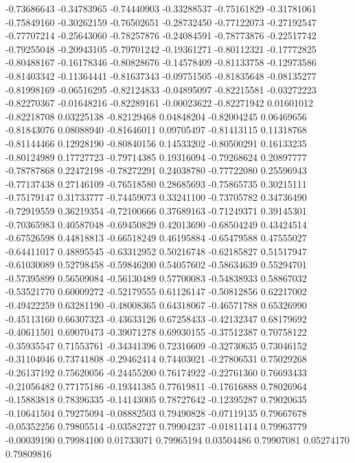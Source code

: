-0.73686643  -0.34783965 
-0.74440903  -0.33288537 
-0.75161829  -0.31781061 
-0.75849160  -0.30262159 
-0.76502651  -0.28732450 
-0.77122073  -0.27192547 
-0.77707214  -0.25643060 
-0.78257876  -0.24084591 
-0.78773876  -0.22517742 
-0.79255048  -0.20943105 
-0.79701242  -0.19361271 
-0.80112321  -0.17772825 
-0.80488167  -0.16178346 
-0.80828676  -0.14578409 
-0.81133758  -0.12973586 
-0.81403342  -0.11364441 
-0.81637343  -0.09751505 
-0.81835648  -0.08135277 
-0.81998169  -0.06516295 
-0.82124833  -0.04895097 
-0.82215581  -0.03272223 
-0.82270367  -0.01648216 
-0.82289161  -0.00023622 
-0.82271942  0.01601012  
-0.82218708  0.03225138  
-0.82129468  0.04848204  
-0.82004245  0.06469656  
-0.81843076  0.08088940  
-0.81646011  0.09705497  
-0.81413115  0.11318768  
-0.81144466  0.12928190  
-0.80840156  0.14533202  
-0.80500291  0.16133235  
-0.80124989  0.17727723  
-0.79714385  0.19316094  
-0.79268624  0.20897777  
-0.78787868  0.22472198  
-0.78272291  0.24038780  
-0.77722080  0.25596943  
-0.77137438  0.27146109  
-0.76518580  0.28685693  
-0.75865735  0.30215111  
-0.75179147  0.31733777  
-0.74459073  0.33241100  
-0.73705782  0.34736490  
-0.72919559  0.36219354  
-0.72100666  0.37689163  
-0.71249371  0.39145301  
-0.70365983  0.40587048  
-0.69450829  0.42013690  
-0.68504249  0.43424514  
-0.67526598  0.44818813  
-0.66518249  0.46195884  
-0.65479588  0.47555027  
-0.64411017  0.48895545  
-0.63312952  0.50216748  
-0.62185827  0.51517947  
-0.61030089  0.52798458  
-0.59846200  0.54057602  
-0.58634639  0.55294701  
-0.57395899  0.56509084  
-0.56130489  0.57700083  
-0.54838933  0.58867032  
-0.53521770  0.60009272  
-0.52179555  0.61126147  
-0.50812856  0.62217002  
-0.49422259  0.63281190  
-0.48008365  0.64318067  
-0.46571788  0.65326990  
-0.45113160  0.66307323  
-0.43633126  0.67258433  
-0.42132347  0.68179692  
-0.40611501  0.69070473  
-0.39071278  0.69930155  
-0.37512387  0.70758122  
-0.35935547  0.71553761  
-0.34341396  0.72316609  
-0.32730635  0.73046152  
-0.31104046  0.73741808  
-0.29462414  0.74403021  
-0.27806531  0.75029268  
-0.26137192  0.75620056  
-0.24455200  0.76174922  
-0.22761360  0.76693433  
-0.21056482  0.77175186  
-0.19341385  0.77619811  
-0.17616888  0.78026964  
-0.15883818  0.78396335  
-0.14143005  0.78727642  
-0.12395287  0.79020635  
-0.10641504  0.79275094  
-0.08882503  0.79490828  
-0.07119135  0.79667678  
-0.05352256  0.79805514  
-0.03582727  0.79904237  
-0.01811414  0.79963779  
-0.00039190  0.79984100  
0.01733071   0.79965194  
0.03504486   0.79907081  
0.05274170   0.79809816  